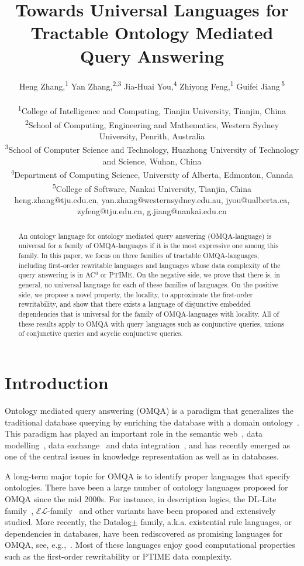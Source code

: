 \documentclass[letterpaper]{article} %
\title{Towards Universal Languages for Tractable Ontology Mediated Query Answering}
\author{Heng Zhang,\textsuperscript{\rm 1} Yan Zhang,\textsuperscript{\rm 2,3} Jia-Huai You,\textsuperscript{\rm 4} Zhiyong Feng,\textsuperscript{\rm 1} Guifei Jiang\,\textsuperscript{\rm 5}\\
%
\\
\textsuperscript{\rm 1}College of Intelligence and Computing, Tianjin University, Tianjin, China\\
\textsuperscript{\rm 2}School of Computing, Engineering and Mathematics, Western Sydney University, Penrith, Australia\\
\textsuperscript{\rm 3}School of Computer Science and Technology, Huazhong University of Technology and Science, Wuhan, China\\
\textsuperscript{\rm 4}Department of Computing Science, University of Alberta, Edmonton, Canada\\
\textsuperscript{\rm 5}College of Software, Nankai University, Tianjin, China\\
heng.zhang@tju.edu.cn, yan.zhang@westernsydney.edu.au, jyou@ualberta.ca, zyfeng@tju.edu.cn, g.jiang@nankai.edu.cn
}
\theoremstyle{definition}
\theoremstyle{remark}
\theoremstyle{definition}
\begin{document}
\maketitle

\begin{abstract}
An ontology language for ontology mediated query answering (OMQA-language) is universal for a family of OMQA-languages if it is the most expressive one among this family. In this paper, we focus on three families of tractable OMQA-languages, including first-order rewritable languages and languages whose data complexity of the query answering is in {AC}$^0$ or PTIME. On the negative side, we prove that there is, in general, no universal language for each of these families of languages. On the positive side, we propose a novel property, the locality, to approximate the first-order rewritability, and show that there exists a language of disjunctive embedded dependencies that is universal for the family of OMQA-languages with locality. All of these results apply to OMQA with query languages such as conjunctive queries, unions of conjunctive queries and acyclic conjunctive queries.
\end{abstract}

\section{Introduction}

Ontology mediated query answering (OMQA) is a paradigm that generalizes the traditional database querying by enriching the database with a domain ontology~\cite{PoggiLCGLR08}. This paradigm has played an important role in the semantic web~\cite{calvanese:DL-lite2007,lutz:ijcai05}, data modelling~\cite{BerardiCG05}, data exchange~\cite{FKMP05} and data integration~\cite{Lenzerini02}, and has recently emerged as one of the central issues in knowledge representation as well as in databases. 

A long-term major topic for OMQA is to identify proper languages that specify ontologies. There have been a large number of ontology languages proposed for OMQA since the mid 2000s. For instance, in description logics, the DL-Lite family~\cite{calvanese:DL-lite2007}, $\mathcal{EL}$-family~\cite{lutz:ijcai05} and other variants have been proposed and extensively studied. More recently, the Datalog${\pm}$ family, a.k.a. existential rule languages, or dependencies in databases, have been rediscovered as promising languages for OMQA, see, e.g.,~\cite{BLMS11,CaliGL12,CaliGP12}. Most of these languages enjoy good computational properties such as the first-order rewritability or {PTIME} data complexity.
\end{document}
